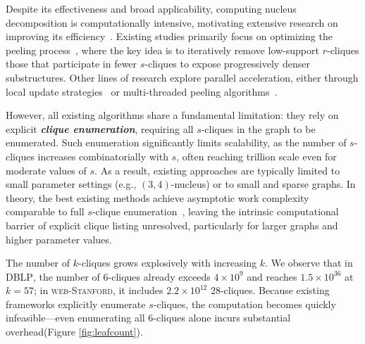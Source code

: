 Despite its effectiveness and broad applicability, computing nucleus decomposition is computationally intensive, motivating extensive research on improving its efficiency~\cite{sotaHierarchy,sotaPrveHierarchy,LocalNuclear,firstNucleus,nuclearTWEB,nuclearcsonet20}. 
%
Existing studies primarily focus on optimizing the peeling process~\cite{sotaPrveHierarchy,sotaHierarchy}, where the key idea is to iteratively remove low-support $r$-cliques those that participate in fewer $s$-cliques to expose progressively denser substructures. 
%
Other lines of research explore parallel acceleration, either through local update strategies~\cite{LocalNuclear} or multi-threaded peeling algorithms~\cite{sotaPrveHierarchy,sotaHierarchy}. 


However, all existing algorithms share a fundamental limitation: they rely on explicit \textbf{\textit{clique enumeration}}, requiring all $s$-cliques in the graph to be enumerated. 
%
Such enumeration significantly limits scalability, as the number of $s$-cliques increases combinatorially with $s$, often reaching trillion scale even for moderate values of $s$. 
%
As a result, existing approaches are typically limited to small parameter settings (e.g., $(3,4)$-nucleus) or to small and sparse graphs.
%
In theory, the best existing methods achieve asymptotic work complexity comparable to full $s$-clique enumeration~\cite{sotaPrveHierarchy,sotaHierarchy}, leaving the intrinsic computational barrier of explicit clique listing unresolved, particularly for larger graphs and higher parameter values.


\begin{example}
    The number of $k$-cliques grows explosively with increasing $k$. 
    We observe that in \textsc{DBLP}, the number of $6$-cliques already exceeds $4\times10^9$ and reaches $1.5\times10^{36}$ at $k{=}57$; in \textsc{web-Stanford}, it includes $2.2\times10^{12}$ $28$-cliques.
    Because existing frameworks explicitly enumerate $s$-cliques, the computation becomes quickly infeasible—even enumerating all $6$-cliques alone incurs substantial overhead(Figure \ref{fig:leafcount}).
\end{example}

